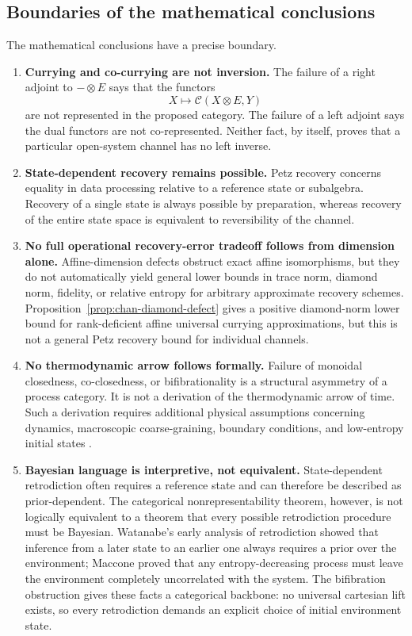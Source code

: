 \documentclass[11pt]{article}
\begin{document}
\subsection{Boundaries of the mathematical conclusions}

The mathematical conclusions have a precise boundary.

\begin{enumerate}[label=\arabic*., leftmargin=*]
\item \textbf{Currying and co-currying are not inversion.} The failure of a
right adjoint to $-\otimes E$ says that the functors
\[
X\longmapsto\mathcal C(X\otimes E,Y)
\]
are not represented in the proposed category. The failure of a left adjoint
says the dual functors are not co-represented. Neither fact, by itself,
proves that a particular open-system channel has no left inverse.

\item \textbf{State-dependent recovery remains possible.} Petz recovery
concerns equality in data processing relative to a reference state or
subalgebra. Recovery of a single state is always possible by preparation,
whereas recovery of the entire state space is equivalent to reversibility
of the channel.

\item \textbf{No full operational recovery-error tradeoff follows from
dimension alone.} Affine-dimension defects obstruct exact affine
isomorphisms, but they do not automatically yield general lower bounds in
trace norm, diamond norm, fidelity, or relative entropy for arbitrary
approximate recovery schemes. Proposition~\ref{prop:chan-diamond-defect}
gives a positive diamond-norm lower bound for rank-deficient affine
universal currying approximations, but this is not a general Petz recovery
bound for individual channels.

\item \textbf{No thermodynamic arrow follows formally.} Failure of monoidal
closedness, co-closedness, or bifibrationality is a structural asymmetry of
a process category. It is not a derivation of the thermodynamic arrow of
time. Such a derivation requires additional physical assumptions concerning
dynamics, macroscopic coarse-graining, boundary conditions, and low-entropy
initial states \cite{Price1996, Wallace2023}.

\item \textbf{Bayesian language is interpretive, not equivalent.}
State-dependent retrodiction often requires a reference state and can
therefore be described as prior-dependent. The categorical
nonrepresentability theorem, however, is not logically equivalent to a
theorem that every possible retrodiction procedure must be Bayesian.
Watanabe's early analysis of retrodiction \cite{Watanabe1955} showed that
inference from a later state to an earlier one always requires a prior over
the environment; Maccone \cite{Maccone2009} proved that any
entropy-decreasing process must leave the environment completely
uncorrelated with the system. The bifibration obstruction gives these facts
a categorical backbone: no universal cartesian lift exists, so every
retrodiction demands an explicit choice of initial environment state.


\end{enumerate}
\end{document}
